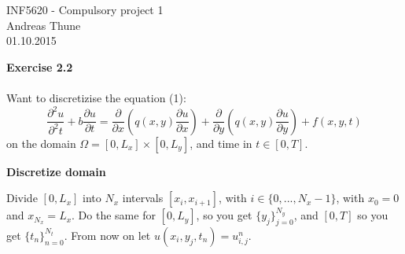 \documentclass[11pt,a4paper]{report}
\begin{document}
\begin{center}
\LARGE INF5620 - Compulsory project 1
\\
Andreas Thune
\\
\LARGE
01.10.2015

\end{center}

\textbf{Exercise 2.2}
\\
\\
Want to discretizise the equation (1): $$ \frac{\partial^2 u}{\partial^2 t} + b\frac{\partial u}{\partial t} = \frac{\partial }{\partial x}(q(x,y)\frac{\partial u}{\partial x}) + \frac{\partial }{\partial y}(q(x,y)\frac{\partial u}{\partial y}) + f(x,y,t)$$ on the domain $\Omega=[0,L_x]\times [0,L_y]$, and time in $t\in [0,T]$.
\begin{center}
\Large \textbf{Discretize domain}
\Large


\end{center}

Divide $[0,L_x]$ into $N_x$ intervals $[x_i,x_{i+1}]$, with $i \in \{0,...,N_x-1\}$, with $x_0=0$ and $x_{N_x}=L_x$. Do the same for $[0,L_y]$, so you get $\{y_j \}_{j=0}^{N_y}$, and $[0,T]$ so you get $\{t_n \}_{n=0}^{N_t}$. From now on let $u(x_i,y_j,t_n)=u_{i,j}^n$.
\end{document}
